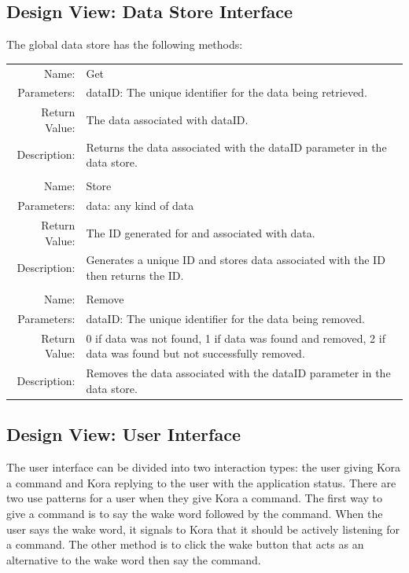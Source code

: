 \documentclass[onecolumn, draftclsnofoot,10pt, compsoc]{IEEEtran}
\def \botname{Kora\xspace}
\begin{document}
    \subsection{Design View: Data Store Interface}
        The global data store has the following methods: \\
        \begin{tabular}[t]{r p{6in}}
            Name: & Get \\
            Parameters: & dataID: The unique identifier for the data being retrieved.\\
            Return Value: & The data associated with dataID.\\
            Description: & Returns the data associated with the dataID parameter in the data store. \\
            & \\
            Name: & Store \\
            Parameters: & data: any kind of data \\
            Return Value: & The ID generated for and associated with data.\\
            Description: & Generates a unique ID and stores data associated with the ID then returns the ID. \\
            & \\
            Name: & Remove \\
            Parameters: & dataID: The unique identifier for the data being removed.\\
            Return Value: & 0 if data was not found, 1 if data was found and removed, 2 if data was found but not successfully removed. \\
            Description: & Removes the data associated with the dataID parameter in the data store. \\
        \end{tabular}

    \subsection{Design View: User Interface}
        The user interface can be divided into two interaction types: the user giving \botname a command and \botname replying to the user with the application status. 
        There are two use patterns for a user when they give \botname a command. The first way to give a command is to say the wake word followed by the command.
        When the user says the wake word, it signals to \botname that it should be actively listening for a command.
        The other method is to click the wake button that acts as an alternative to the wake word then say the command.  
        \\[0.1in]
\end{document}
